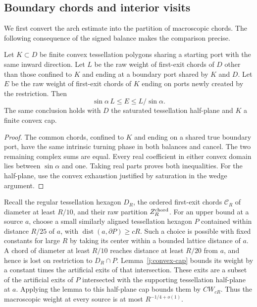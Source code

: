 \subsection{Boundary chords and interior visits}

We first convert the arch estimate into the partition of macroscopic
chords. The following consequence of the signed balance makes the
comparison precise.

\begin{lemma}\label{j:convex-cap}
Let $K\subset D$ be finite convex tessellation polygons sharing a
starting port with the same inward direction. Let $L$ be the raw weight
of first-exit chords of $D$ other than those confined to $K$ and ending
at a boundary port shared by $K$ and $D$. Let $E$ be
the raw weight of first-exit chords of $K$ ending on ports newly created
by the restriction. Then
\[
 \sin\alpha\,L\le E\le L/\sin\alpha.
\]
The same conclusion holds with $D$ the saturated tessellation
half-plane and $K$ a finite convex cap.
\end{lemma}

\begin{proof}
The common chords, confined to $K$ and ending on a shared true boundary
port, have the same intrinsic turning phase in both balances and cancel.
The two remaining complex sums are equal. Every real coefficient in
either convex domain lies between $\sin\alpha$ and one. Taking real
parts proves both inequalities. For the half-plane, use the convex
exhaustion justified by saturation in the wedge argument.
\end{proof}

Recall the regular tessellation hexagon $D_R$, the ordered first-exit
chords $\mathcal C_R$ of diameter at least $R/10$, and their raw
partition $Z_R^{\rm chord}$. For an upper bound at a source $a$, choose
a small similarly aligned tessellation hexagon $P$ contained within
distance $R/25$ of $a$, with
$\operatorname{dist}(a,\partial P)\ge cR$. Such a choice is possible
with fixed constants for large $R$ by taking its center within a bounded
lattice distance of $a$. A chord of diameter at least $R/10$ reaches
distance at least $R/20$ from $a$, and hence is lost on restriction to
$D_R\cap P$. Lemma~\ref{j:convex-cap} bounds its weight by a constant
times the artificial exits of that intersection. These exits are a
subset of the artificial exits of $P$ intersected with the supporting
tessellation half-plane at $a$. Applying the lemma to this half-plane
cap bounds them by $CW_{cR}$. Thus the macroscopic weight at every
source is at most $R^{-1/4+o(1)}$.

